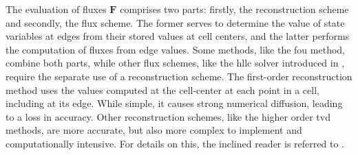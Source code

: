 \label{fix:reconstruction}
The evaluation of fluxes $\mathbf{F}$ comprises two parts: firstly, the reconstruction scheme and secondly, the flux scheme. The former serves to determine the value of state variables at edges from their stored values at cell centers, and the latter performs the computation of fluxes from edge values.
Some methods, like the \gls{fou} method, combine both 
parts,
while other flux schemes, like the \gls{hllc} solver introduced in \textcite{toro1994}, require the separate use of a reconstruction scheme.
The first-order reconstruction method uses the values computed at the cell-center at each point in a cell, including at its edge. 
While simple, it
causes strong numerical diffusion, leading to a loss in accuracy.
Other reconstruction schemes, like the higher order \gls{tvd} methods, are more accurate, 
but also more complex to implement and computationally intensive.
For details on this, the inclined reader is referred to \textcite{simons2020}.





	


